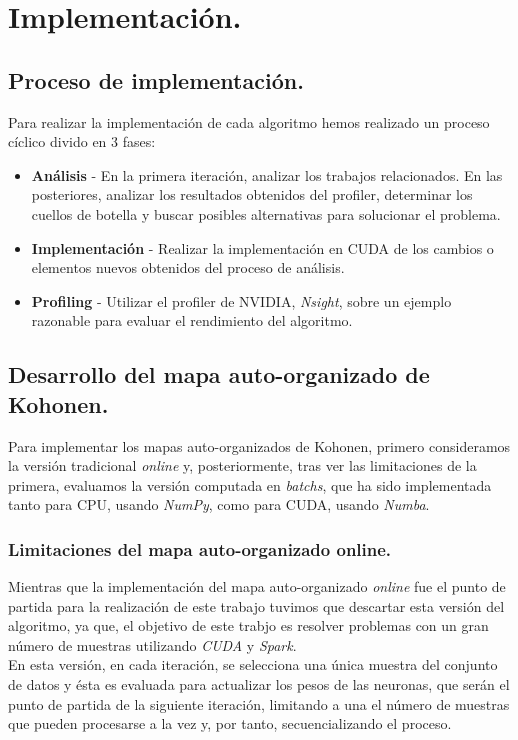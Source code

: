 \chapter{Implementación.}

\section{Proceso de implementación.}
Para realizar la implementación de cada algoritmo hemos realizado un proceso cíclico divido en 3 fases:

\begin{itemize}
	\item \textbf{Análisis} - En la primera iteración, analizar los trabajos relacionados. En las posteriores, analizar los resultados obtenidos del profiler, determinar los cuellos de botella y buscar posibles alternativas para solucionar el problema.
	\item \textbf{Implementación} - Realizar la implementación en CUDA de los cambios o elementos nuevos obtenidos del proceso de análisis.
	\item \textbf{Profiling} - Utilizar el profiler de NVIDIA, \textit{Nsight}, sobre un ejemplo razonable para evaluar el rendimiento del algoritmo.
\end{itemize}

\section{Desarrollo del mapa auto-organizado de Kohonen.}
Para implementar los mapas auto-organizados de Kohonen, primero consideramos la versión tradicional \textit{online} y, posteriormente, tras ver las limitaciones de la primera, evaluamos la versión computada en \textit{batchs}, que ha sido implementada tanto para CPU, usando \textit{NumPy}, como para CUDA, usando \textit{Numba}.

\subsection{Limitaciones del mapa auto-organizado online.}
Mientras que la implementación del mapa auto-organizado \textit{online} fue el punto de partida para la realización de este trabajo tuvimos que descartar esta versión del algoritmo, ya que, el objetivo de este trabjo es resolver problemas con un gran número de muestras utilizando \textit{CUDA} y \textit{Spark}.\\

En esta versión, en cada iteración, se selecciona una única muestra del conjunto de datos y ésta es evaluada para actualizar los pesos de las neuronas, que serán el punto de partida de la siguiente iteración, limitando a una el número de muestras que pueden procesarse a la vez y, por tanto, secuencializando el proceso.\\

